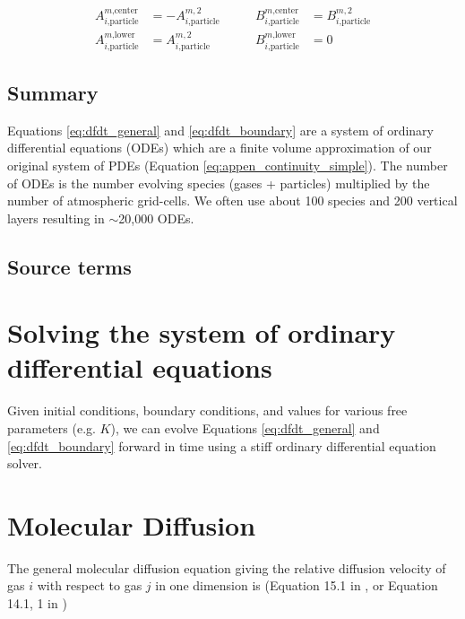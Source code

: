 \begin{equation*}
  \begin{aligned}
  A_{i\text{,particle}}^{m\text{,center}} &= - A_{i\text{,particle}}^{m,2} \\
  A_{i\text{,particle}}^{m\text{,lower}} &= A_{i\text{,particle}}^{m,2}
  \end{aligned}
  \quad\quad
  \begin{aligned}
  B_{i\text{,particle}}^{m\text{,center}} &= B_{i\text{,particle}}^{m,2} \\
  B_{i\text{,particle}}^{m\text{,lower}} &= 0
  \end{aligned}
\end{equation*}

\subsection{Summary}

Equations \eqref{eq:dfdt_general} and \eqref{eq:dfdt_boundary} are a system of ordinary differential equations (ODEs) which are a finite volume approximation of our original system of PDEs (Equation \eqref{eq:appen_continuity_simple}). The number of ODEs is the number evolving species (gases + particles) multiplied by the number of atmospheric grid-cells. We often use about 100 species and 200 vertical layers resulting in $\sim$20,000 ODEs.

\subsection{Source terms}



\section{Solving the system of ordinary differential equations}

Given initial conditions, boundary conditions, and values for various free parameters (e.g. $K$), we can evolve Equations \eqref{eq:dfdt_general} and \eqref{eq:dfdt_boundary} forward in time using a stiff ordinary differential equation solver.

\section{Molecular Diffusion} \label{sec:molecular_diffusion}

The general molecular diffusion equation giving the relative diffusion velocity of gas $i$ with respect to gas $j$ in one dimension is (Equation 15.1 in \citet{Banks_2013}, or Equation 14.1, 1 in \citet{Chapman_1990})

